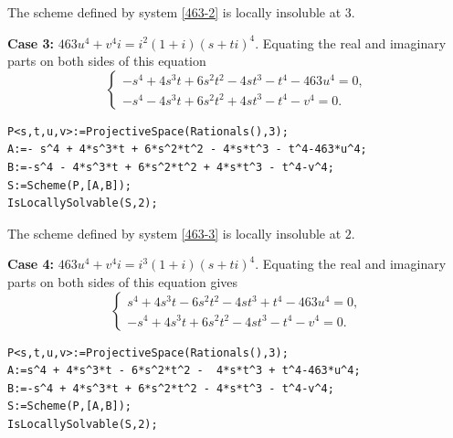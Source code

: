 \documentclass[a4paper,12pt,english,reqno]{amsart}
\begin{document}
The scheme defined by system \eqref{463-2} is locally insoluble at $3$.

{\bf Case 3:} $463u^4+v^4i=i^2(1+i)(s+ti)^4$. Equating the real and imaginary parts on both sides of this equation 
\begin{equation}\label{463-3}
\begin{cases}
- s^4 + 4s^3t + 6s^2t^2 - 4st^3 - t^4-463u^4=0,\\
-s^4 - 4s^3t + 6s^2t^2 + 4st^3 - t^4-v^4=0.
\end{cases}
\end{equation}

\begin{lstlisting}
P<s,t,u,v>:=ProjectiveSpace(Rationals(),3);
A:=- s^4 + 4*s^3*t + 6*s^2*t^2 - 4*s*t^3 - t^4-463*u^4;
B:=-s^4 - 4*s^3*t + 6*s^2*t^2 + 4*s*t^3 - t^4-v^4;
S:=Scheme(P,[A,B]);
IsLocallySolvable(S,2);
\end{lstlisting}

The scheme defined by system \eqref{463-3} is locally insoluble at $2$.


{\bf Case 4:} $463u^4+v^4i=i^3(1+i)(s+ti)^4$. Equating the real and imaginary parts on both sides of this equation gives
\begin{equation}\label{463-4}
\begin{cases}
s^4 + 4s^3t - 6s^2t^2 -  4st^3 + t^4-463u^4=0,\\
-s^4 + 4s^3t + 6s^2t^2 - 4st^3 - t^4-v^4=0.
\end{cases}
\end{equation}

%
\begin{lstlisting}
P<s,t,u,v>:=ProjectiveSpace(Rationals(),3);
A:=s^4 + 4*s^3*t - 6*s^2*t^2 -  4*s*t^3 + t^4-463*u^4;
B:=-s^4 + 4*s^3*t + 6*s^2*t^2 - 4*s*t^3 - t^4-v^4;
S:=Scheme(P,[A,B]);
IsLocallySolvable(S,2);
\end{lstlisting}
\end{document}
